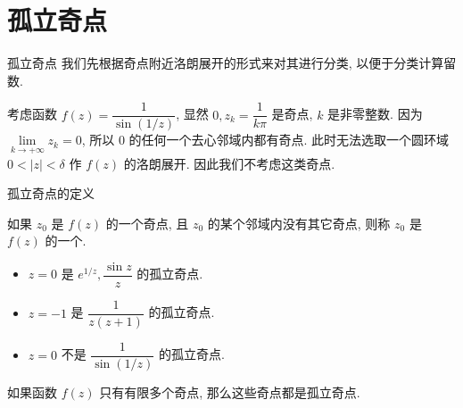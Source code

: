 \section{孤立奇点}


\begin{frame}{孤立奇点}
\onslide<+->
我们先根据奇点附近洛朗展开的形式来对其进行分类, 以便于分类计算留数.
\begin{example}
考虑函数 $f(z)=\dfrac1{\sin(1/z)}$, 显然 $0,z_k=\dfrac1{k\pi}$ 是奇点, $k$ 是非零整数.
\onslide<+->
因为 $\lim\limits_{k\to+\infty} z_k=0$, 所以 $0$ 的任何一个去心邻域内都有奇点.
\onslide<+->
此时无法选取一个圆环域 $0<|z|<\delta$ 作 $f(z)$ 的洛朗展开.
\onslide<+->
因此我们不考虑这类奇点.
\begin{center}
\end{center}
\end{example}
\end{frame}


\begin{frame}{孤立奇点的定义}
\begin{definition}
如果 $z_0$ 是 $f(z)$ 的一个奇点, 且 $z_0$ 的某个邻域内没有其它奇点, 则称 $z_0$ 是 $f(z)$ 的一个.
\end{definition}
\begin{example}
\begin{itemize}
\item $z=0$ 是 $e^{1/z},\dfrac{\sin z}z$ 的孤立奇点.
\item $z=-1$ 是 $\dfrac1{z(z+1)}$ 的孤立奇点.
\item $z=0$ 不是 $\dfrac1{\sin(1/z)}$ 的孤立奇点.
\end{itemize}
\end{example}
\onslide<+->
如果函数 $f(z)$ 只有有限多个奇点, 那么这些奇点都是孤立奇点.
\end{frame}


